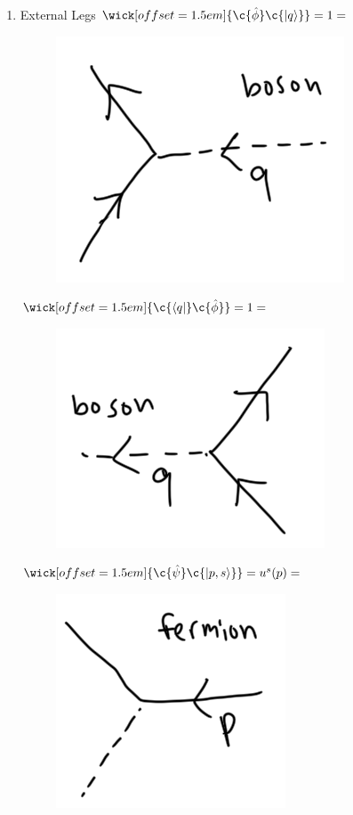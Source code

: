 \begin{enumerate}
\item External Legs
	\subitem $\wick[offset=1.5em]{\c {\hat{\phi}} \c {\ket{q}}} = 1 = $ \begin{figure}[H]\centering \includegraphics[scale=0.5]{images/bosonket.png}  \end{figure}
	\subitem $\wick[offset=1.5em]{\c {\bra{q}} \c {\hat{\phi}}} = 1 = $ \begin{figure}[H]\centering \includegraphics[scale=0.5]{images/bosonbra.png}  \end{figure}
	\subitem $\wick[offset=1.5em]{\c {\hat{\psi}} \c {\ket{p,s}}} = u^s (p) = $ \begin{figure}[H]\centering \includegraphics[scale=0.5]{images/fermionket.png}  \end{figure}

\end{enumerate}
